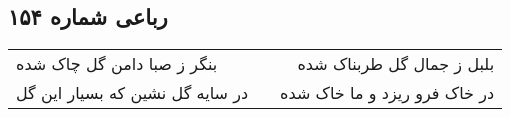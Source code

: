 \begin{center}
\section*{رباعی شماره ۱۵۴}
\label{sec:sh154}
\begin{longtable}{l p{0.5cm} r}
بنگر ز صبا دامن گل چاک شده
&&
بلبل ز جمال گل طربناک شده
\\
در سایه گل نشین که بسیار این گل
&&
در خاک فرو ریزد و ما خاک شده
\\
\end{longtable}
\end{center}
